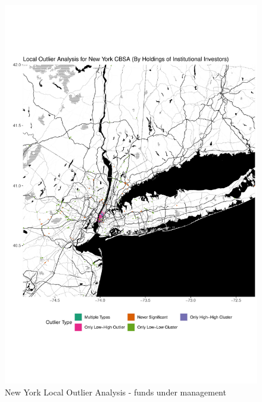 \begin{figure}
	\centering
	\includegraphics[width=1\linewidth]{Figures/ChapterIV/NY_Money_LO}
	\caption[New York CBSA Local Outlier Analysis - Funds Under Management 2013-2018]{New York Local Outlier Analysis - funds under management}
	\label{fig:NYClocaloutlier}
\end{figure}

